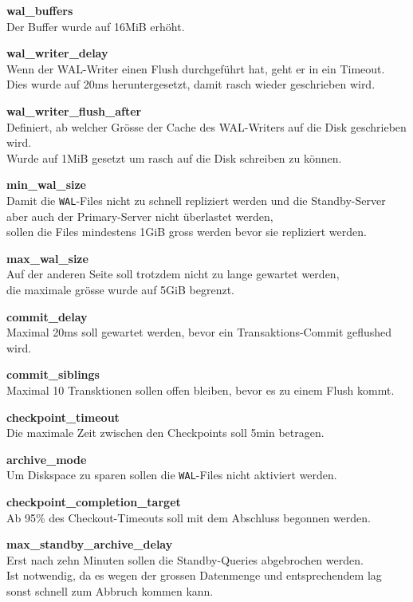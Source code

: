 \begin{flushleft}
\begin{description}
        \item \textbf{wal\_buffers}\hfill \\Der Buffer wurde auf 16MiB erhöht.
        \item \textbf{wal\_writer\_delay}\hfill \\Wenn der WAL-Writer einen Flush durchgeführt hat, geht er in ein Timeout.\\Dies wurde auf 20ms heruntergesetzt, damit rasch wieder geschrieben wird.
        \item \textbf{wal\_writer\_flush\_after}\hfill \\Definiert, ab welcher Grösse der Cache des WAL-Writers auf die Disk geschrieben wird.\\Wurde auf 1MiB gesetzt um rasch auf die Disk schreiben zu können.
        \item \textbf{min\_wal\_size}\hfill \\Damit die \texttt{WAL}-Files nicht zu schnell repliziert werden und die Standby-Server aber auch der Primary-Server nicht überlastet werden,\\sollen die Files mindestens 1GiB gross werden bevor sie repliziert werden.
        \item \textbf{max\_wal\_size}\hfill \\Auf der anderen Seite soll trotzdem nicht zu lange gewartet werden,\\die maximale grösse wurde auf 5GiB begrenzt.
        \item \textbf{commit\_delay}\hfill \\Maximal 20ms soll gewartet werden, bevor ein Transaktions-Commit geflushed wird.
        \item \textbf{commit\_siblings}\hfill \\Maximal 10 Transktionen sollen offen bleiben, bevor es zu einem Flush kommt.
        \item \textbf{checkpoint\_timeout}\hfill \\Die maximale Zeit zwischen den Checkpoints soll 5min betragen.
        \item \textbf{archive\_mode}\hfill \\Um Diskspace zu sparen sollen die \texttt{WAL}-Files nicht aktiviert werden.
        \item \textbf{checkpoint\_completion\_target}\hfill \\Ab 95\% des Checkout-Timeouts soll mit dem Abschluss begonnen werden.
        \item \textbf{max\_standby\_archive\_delay}\hfill \\Erst nach zehn Minuten sollen die Standby-Queries abgebrochen werden.\\Ist notwendig, da es wegen der grossen Datenmenge und entsprechendem lag sonst schnell zum Abbruch kommen kann.

\end{description}
\end{flushleft}
